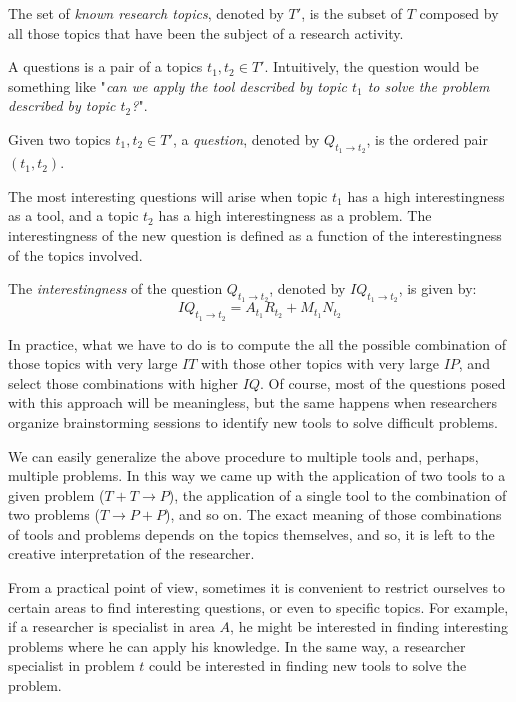 \begin{definition}
The set of \emph{known research topics}, denoted by $T'$, is the subset of $T$ composed by all those topics that have been the subject of a research activity.
\end{definition}

A questions is a pair of a topics $t_{1}, t_{2} \in T'$. Intuitively, the question would be something like "\emph{can we apply the tool described by topic $t_{1}$ to solve the problem described by topic $t_{2}$?}".

\begin{definition}
Given two topics $t_{1}, t_{2} \in T'$, a \emph{question}, denoted by $Q_{t_{1}\rightarrow t_{2}}$, is the ordered pair $\left(t_{1},t_{2}\right)$.
\end{definition}

The most interesting questions will arise when topic $t_{1}$ has a high interestingness as a tool, and a topic $t_{2}$ has a high interestingness as a problem. The interestingness of the new question is defined as a function of the interestingness of the topics involved.

\begin{definition}
The \emph{interestingness} of the question $Q_{t_{1}\rightarrow t_{2}}$, denoted by $IQ_{t_{1} \rightarrow t_{2}}$, is given by:
\[
IQ_{t_{1} \rightarrow t_{2}}=A_{t_{1}}R_{t_{2}}+M_{t_{1}}N_{t_{2}}
\]
\end{definition}

In practice, what we have to do is to compute the all the possible combination of those topics with very large $IT$ with those other topics with very large $IP$, and select those combinations with higher $IQ$. Of course, most of the questions posed with this approach will be meaningless, but the same happens when researchers organize brainstorming sessions to identify new tools to solve difficult problems.

We can easily generalize the above procedure to multiple tools and, perhaps, multiple problems. In this way we came up with the application of two tools to a given problem ($T+T \rightarrow P$), the application of a single tool to the combination of two problems ($T \rightarrow P + P$), and so on. The exact meaning of those combinations of tools and problems depends on the topics themselves, and so, it is left to the creative interpretation of the researcher.

From a practical point of view, sometimes it is convenient to restrict ourselves to certain areas to find interesting questions, or even to specific topics. For example, if a researcher is specialist in area $A$, he might be interested in finding interesting problems where he can apply his knowledge. In the same way, a researcher specialist in problem $t$ could be interested in finding new tools to solve the problem.

